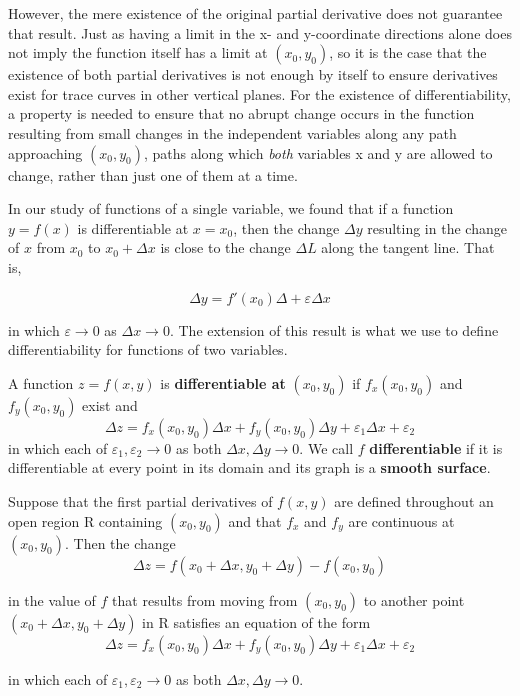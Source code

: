 \documentclass[12pt,a4paper]{article}
\newenvironment{definition}{\begin{definitionbox}}{\end{definitionbox}\vspace{1\baselineskip}}
\newenvironment{theorem}{\begin{theorembox}}{\end{theorembox}\vspace{1\baselineskip}}
\begin{document}
However, the mere existence of the original partial derivative does not guarantee that result. Just as having a limit in the x- and y-coordinate directions alone does not imply the function itself has a limit at \((x_0,y_0)\), so it is the case that the existence of both partial derivatives is not enough by itself to ensure derivatives exist for trace curves in other vertical planes. 
For the existence of differentiability, a property is needed to ensure that no abrupt change occurs in the function resulting from small changes in the independent variables along any path approaching \((x_0,y_0)\), paths along which \textit{both} variables x and y are allowed to change, rather than just one of them at a time.


In our study of functions of a single variable, we found that if a function \(y= f(x)\) is differentiable at \(x=x_0\), then the change \(\Delta y\) resulting in the change of \(x\) from \(x_0\) to \(x_0 + \Delta x\) is close to the change \(\Delta L\) along the tangent line. That is,

\[\Delta y= f'(x_0)\Delta + \varepsilon \Delta x\]

in which \(\varepsilon \to 0\) as \(\Delta x \to 0\). The extension of this result is what we use to define differentiability for functions of two variables.

\begin{definition}
    A function \(z = f(x,y)\) is \textbf{differentiable at} \((x_0,y_0)\) if \(f_x(x_0,y_0)\) and \(f_y(x_0,y_0)\) exist and 
    \[\Delta z = f_x(x_0,y_0) \Delta x + f_y(x_0,y_0) \Delta y + \varepsilon_1\Delta x + \varepsilon_2\]
    in which each of \(\varepsilon_1, \varepsilon_2 \to 0\) as both \(\Delta x, \Delta y \to 0\). We call \(f\) \textbf{differentiable} if it is differentiable at every point in its domain and its graph is a \textbf{smooth surface}.

\end{definition}


\begin{theorem}
    Suppose that the first partial derivatives of \(f(x,y)\) are defined throughout an open region R containing \((x_0,y_0)\) and that \(f_x\) and \(f_y\) are continuous at \((x_0,y_0)\). Then the change
    \[\Delta z = f(x_0 + \Delta x, y_0 + \Delta y) - f(x_0,y_0)\]
    
    in the value of \(f\) that results from moving from \((x_0,y_0)\) to another point \((x_0 +\Delta x,y_0+ \Delta y)\) in R satisfies an equation of the form
    \[\Delta z = f_x(x_0,y_0) \Delta x + f_y(x_0,y_0) \Delta y + \varepsilon_1\Delta x + \varepsilon_2\]

    in which each of \(\varepsilon_1, \varepsilon_2 \to 0\) as both \(\Delta x, \Delta y \to 0\).
\end{theorem}
\end{document}
